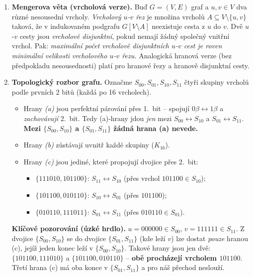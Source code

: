 \begin{enumerate}
  \item \textbf{Mengerova věta (vrcholová verze).} Buď $G=(V,E)$ graf a $u,v\in V$ dva různé nesousední vrcholy. \emph{Vrcholový $u$-$v$ řez} je množina vrcholů $A\subseteq V\setminus\{u,v\}$ taková, že v indukovaném podgrafu $G[V\setminus A]$ neexistuje cesta z $u$ do $v$. Dvě $u$-$v$ cesty jsou \emph{vrcholově disjunktní}, pokud nemají žádný společný vnitřní vrchol. Pak: \emph{maximální počet vrcholově disjunktních $u$-$v$ cest je roven minimální velikosti vrcholového $u$-$v$ řezu.} Analogická hranová verze (bez předpokladu nesousednosti) platí pro hranové řezy a hranově disjunktní cesty.

  \item \textbf{Topologický rozbor grafu.} Označme $S_{00}, S_{01}, S_{10}, S_{11}$ čtyři skupiny vrcholů podle prvních 2 bitů (každá po 16 vrcholech).
  \begin{itemize}
    \item Hrany \emph{(a)} jsou perfektní párování přes 1.\ bit -- spojují $0\beta\leftrightarrow 1\beta$ a \emph{zachovávají} 2.\ bit. Tedy (a)-hrany jdou \emph{jen} mezi $S_{00}\leftrightarrow S_{10}$ a $S_{01}\leftrightarrow S_{11}$. \textbf{Mezi $\{S_{00},S_{10}\}$ a $\{S_{01},S_{11}\}$ žádná hrana (a) nevede.}
    \item Hrany \emph{(b)} zůstávají uvnitř každé skupiny ($K_{16}$).
    \item Hrany \emph{(c)} jsou jediné, které propojují dvojice přes 2.\ bit:
      \begin{itemize}
        \item $\{111010,101100\}$: $S_{11}\leftrightarrow S_{10}$ (přes vrchol $101100\in S_{10}$);
        \item $\{101100,010110\}$: $S_{10}\leftrightarrow S_{01}$ (přes $101100$);
        \item $\{010110,111011\}$: $S_{01}\leftrightarrow S_{11}$ (přes $010110\in S_{01}$).
      \end{itemize}
  \end{itemize}

  \textbf{Klíčové pozorování (úzké hrdlo).} $u=000000\in S_{00}$, $v=111111\in S_{11}$. Z dvojice $\{S_{00},S_{10}\}$ se do dvojice $\{S_{01},S_{11}\}$ (kde leží $v$) lze dostat \emph{pouze} hranou (c), jejíž jeden konec leží v $\{S_{00},S_{10}\}$. Takové hrany jsou jen dvě: $\{101100,111010\}$ a $\{101100,010110\}$ -- \textbf{obě procházejí vrcholem $101100$}. Třetí hrana (c) má oba konce v $\{S_{01},S_{11}\}$ a pro náš přechod neslouží.


\end{enumerate}
